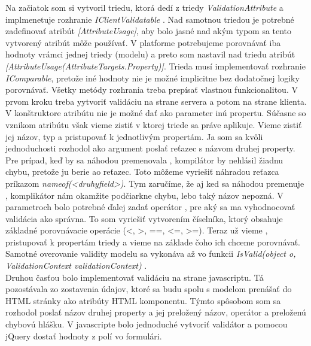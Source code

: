 \documentclass[11pt, oneside]{report}
\begin{document}
Na začiatok som si vytvoril triedu, ktorá dedí z triedy \textit{ValidationAttribute} a implmenetuje rozhranie \textit{IClientValidatable} . Nad samotnou triedou je potrebné zadefinovať atribút \textit{[AttributeUsage]}, aby bolo jasné nad akým typom sa tento vytvorený atribút môže používať. V platforme potrebujeme porovnávať iba hodnoty vrámci jednej triedy (modelu)  a preto  som nastavil nad triedu atribút \textit{[AttributeUsage(AttributeTargets.Property)]}. Trieda musí implementovať rozhranie \textit{IComparable}, pretože iné hodnoty nie je možné implicitne bez dodatočnej logiky porovnávať. Všetky metódy rozhrania treba prepísať vlastnou funkcionalitou.  V prvom kroku  treba yytvoriť validáciu na strane servera a potom na strane klienta. V konštruktore atribútu nie je možné dať ako parameter inú propertu. Súčasne so vznikom atribútu však vieme zistiť v ktorej triede sa práve aplikuje. Vieme zistiť jej názov, typ a pristupovať  k jednotlivým propertám. Ja som sa kvôli jednoduchosti rozhodol ako argument poslať reťazec s názvom druhej property.  Pre prípad, keď by sa náhodou premenovala ,  kompilátor by nehlásil žiadnu chybu, pretože ju berie ao reťazec. Toto môžeme vyriešiť náhradou reťazca príkazom  \textit{nameof(<druhyfield>)}. Tym zaručíme, že aj ked sa  náhodou premenuje , komplikátor nám okamžite podčiarkne chybu, lebo taký názov nepozná. V parametroch bolo potrebné ďalej zadať operátor , pre aký sa ma vyhodnocovať validácia ako správna. To som vyriešiť vytvorením číselníka, ktorý obsahuje základné porovnávacie operácie (<, >, ==, <=, >=). Teraz už vieme , pristupovať k propertám triedy a vieme na základe čoho ich chceme porovnávať. Samotné overovanie  validity modelu sa vykonáva až vo funkcii \textit{IsValid(object o, ValidationContext validationContext)} .  \\
Druhou časťou bolo implementovať validáciu na strane javascriptu. Tá pozostávala zo zostavenia údajov, ktoré sa budu spolu s modelom  prenášať do HTML stránky ako atribúty HTML komponentu. Týmto spôsobom som sa rozhodol poslať názov druhej property a jej preložený názov, operátor a preloženú chybovú hlášku. V javascripte bolo jednoduché vytvoriť validátor a pomocou jQuery dostať hodnoty z polí vo formulári. 
\end{document}

